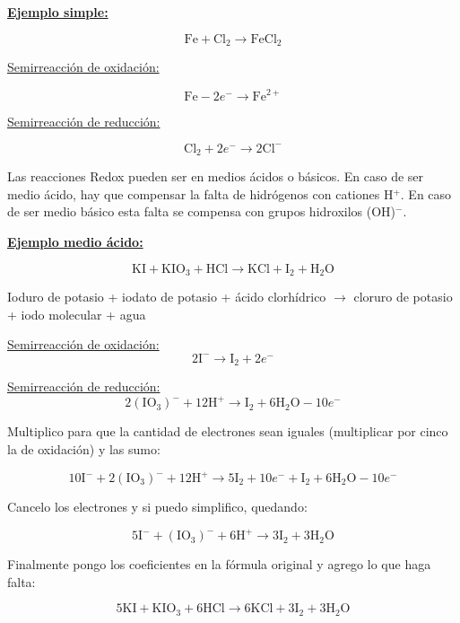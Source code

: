 \newpage
\noindent\textbf{\underline{Ejemplo simple:}}

$$\text{Fe} + \text{Cl}_2 \longrightarrow \text{FeCl}_2$$

\begin{multicols}{2}

\underline{Semirreacción de oxidación:}

$$\text{Fe} - 2e^- \longrightarrow \text{Fe}^{2+}$$

\underline{Semirreacción de reducción:}

$$\text{Cl}_2 + 2e^- \longrightarrow 2\text{Cl}^{-} $$

\end{multicols}

Las reacciones Redox pueden ser en medios ácidos o básicos. En caso de ser medio ácido, hay que compensar la falta de hidrógenos con cationes H$^+$. En caso de ser medio básico esta falta se compensa con grupos hidroxilos (OH)$^-$.

\skipline
\noindent\textbf{\underline{Ejemplo medio ácido:}}

$$\text{KI} + \text{K} \text{I} \text{O}_3 + \text{H} \text{Cl} \longrightarrow
\text{KCl} + \text{I}_2 +  \text{H}_2 \text{O}$$

\hfil Ioduro de potasio \hfil + \hfil iodato de potasio \hfil + \hfil ácido clorhídrico \hfil
$\rightarrow$ \hfil
cloruro de potasio \hfil + \hfil iodo molecular \hfil + \hfil agua \hfil 

\begin{multicols}{2}

\underline{Semirreacción de oxidación:}
$$2\text{I}^{-} \longrightarrow \text{I}_2 + 2e^-$$

\underline{Semirreacción de reducción:}
$$2(\text{IO}_3)^{-} + 12 \text{H}^+ \longrightarrow \text{I}_2 + 6\text{H}_2 \text{O} - 10e^-$$
\end{multicols}

Multiplico para que la cantidad de electrones sean iguales (multiplicar por cinco la de oxidación) y las sumo:

$$10\text{I}^{-} + 2(\text{IO}_3)^{-} + 12 \text{H}^+ \longrightarrow 5 \text{I}_2 + 10 e^- + \text{I}_2 + 6\text{H}_2 \text{O} - 10e^-$$

Cancelo los electrones y si puedo simplifico, quedando:

$$5\text{I}^{-} + (\text{IO}_3)^{-} + 6 \text{H}^+ \longrightarrow 3 \text{I}_2 + 3\text{H}_2 \text{O}$$

Finalmente pongo los coeficientes en la fórmula original y agrego lo que haga falta:

$$5\text{KI} + \text{K} \text{I} \text{O}_3 + 6\text{H} \text{Cl} \longrightarrow
6\text{KCl} + 3\text{I}_2 +  3\text{H}_2 \text{O}$$
